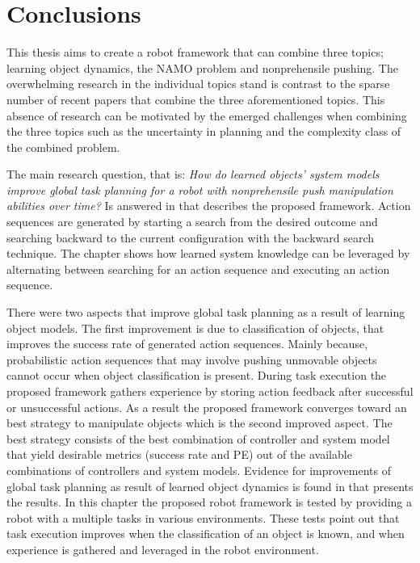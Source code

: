 \chapter{Conclusions}%
\label{chap:conclusion}
This thesis aims to create a robot framework that can combine three topics; learning object dynamics, the \ac{NAMO} problem and nonprehensile pushing. The overwhelming research in the individual topics stand is contrast to the sparse number of recent papers that combine the three aforementioned topics. This absence of research can be motivated by the emerged challenges when combining the three topics such as the uncertainty in planning and the complexity class of the combined problem.\bs

The main research question, that is: \textit{How do learned objects' system models improve global task planning for a robot with nonprehensile push manipulation abilities over time?} Is answered in  that describes the proposed framework. Action sequences are generated by starting a search from the desired outcome and searching backward to the current configuration with the backward search technique. The chapter shows how learned system knowledge can be leveraged by alternating between searching for an action sequence and executing an action sequence.\bs

There were two aspects that improve global task planning as a result of learning object models. The first improvement is due to classification of objects, that improves the success rate of generated action sequences. Mainly because, probabilistic action sequences that may involve pushing unmovable objects cannot occur when object classification is present. During task execution the proposed framework gathers experience by storing action feedback after successful or unsuccessful actions. As a result the proposed framework converges toward an best strategy to manipulate objects which is the second improved aspect. The best strategy consists of the best combination of controller and system model that yield desirable metrics (success rate and \acl{PE}) out of the available combinations of controllers and system models. Evidence for improvements of global task planning as result of learned object dynamics is found in  that presents the results. In this chapter the proposed robot framework is tested by providing a robot with a multiple tasks in various environments. These tests point out that task execution improves when the classification of an object is known, and when experience is gathered and leveraged in the robot environment.\bs


